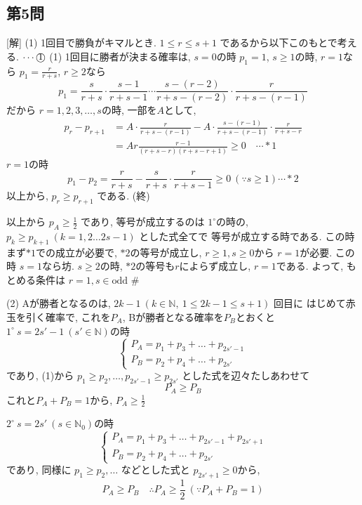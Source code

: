 \documentclass[../main.tex]{subfiles}
\begin{document}
\subsection*{第5問}
[解] (1) 1回目で勝負がキマルとき. $1 \le r \le s+1$ であるから以下このもとで考える. $\cdots \text{\textcircled{1}}$
(1) 1回目に勝者が決まる確率は, $s=0$の時 $p_1 = 1$, $s \ge 1$の時, $r=1$なら $p_1 = \frac{r}{r+s}$, $r \ge 2$なら
$$ p_1 = \frac{s}{r+s} \cdot \frac{s-1}{r+s-1} \cdots \frac{s-(r-2)}{r+s-(r-2)} \cdot \frac{r}{r+s-(r-1)} $$
だから $r=1,2,3,\dots,s$の時, 一部を$A$として,
\begin{align*}
  p_r - p_{r+1} &= A \cdot \frac{r}{r+s-(r-1)} - A \cdot \frac{s-(r-1)}{r+s-(r-1)} \cdot \frac{r}{r+s-r} \\
  &= A r \frac{r-1}{(r+s-r)(r+s-r+1)} \ge 0 \quad \cdots *1
\end{align*}
$r=1$の時
$$ p_1 - p_2 = \frac{r}{r+s} - \frac{s}{r+s} \cdot \frac{r}{r+s-1} \ge 0 \ (\because s \ge 1) \cdots *2 $$
以上から, $p_r \ge p_{r+1}$ である. (終)

以上から $p_A \ge \frac{1}{2}$ であり, 等号が成立するのは
$1^\circ$の時の, $p_k \ge p_{k+1} \ (k=1,2 \dots 2s-1)$ とした式全てで
等号が成立する時である. この時まず$*1$での成立が必要で,
$*2$の等号が成立し, $r \ge 1, s \ge 0$から $r=1$が必要. この時 $s=1$なら坊.
$s \ge 2$の時, $*2$の等号も$r$によらず成立し, $r=1$である.
よって, もとめる条件は $r=1, s \in \text{odd}$ \hfill \#

(2) Aが勝者となるのは, $2k-1 \ (k \in \mathbb{N}, \ 1 \le 2k-1 \le s+1)$ 回目に
はじめて赤玉を引く確率で, これを$P_A$, Bが勝者となる確率を$P_B$とおくと
$1^\circ \ s=2s'-1 \ (s' \in \mathbb{N})$の時
$$
\begin{cases}
  P_A = p_1 + p_3 + \dots + p_{2s'-1} \\
  P_B = p_2 + p_4 + \dots + p_{2s'}
\end{cases}
$$
であり, (1)から $p_1 \ge p_2, \dots, p_{2s'-1} \ge p_{2s'}$ とした式を辺々たしあわせて
$$ P_A \ge P_B $$
これと$P_A + P_B = 1$から, $P_A \ge \frac{1}{2}$

$2^\circ \ s=2s' \ (s \in \mathbb{N}_0)$の時
$$
\begin{cases}
  P_A = p_1 + p_3 + \dots + p_{2s'-1} + p_{2s'+1} \\
  P_B = p_2 + p_4 + \dots + p_{2s'}
\end{cases}
$$
であり, 同様に $p_1 \ge p_2, \dots$ などとした式と $p_{2s'+1} \ge 0$から,
$$ P_A \ge P_B \quad \therefore P_A \ge \frac{1}{2} \ (\because P_A + P_B = 1) $$
\end{document}
